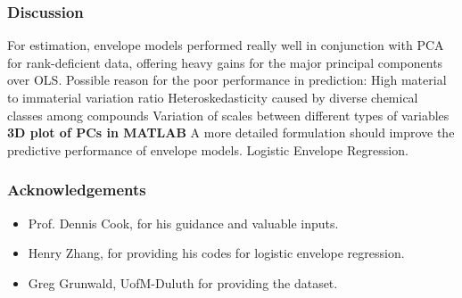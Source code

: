 \documentclass[handout,10pt]{beamer}
\newcommand{\colubf}{\color{UniBlue} \bf}
\begin{document}
\begin{frame}
\frametitle{Discussion}
\begin{outline}
\1 For estimation, envelope models performed really well in conjunction with PCA for rank-deficient data, offering heavy gains for the major principal components over OLS.
\vspace{.2cm}
\1 Possible reason for the poor performance in prediction:
\2 High material to immaterial variation ratio
\2 Heteroskedasticity caused by diverse chemical classes among compounds
\2 Variation of scales between different types of variables
\vspace{.2cm}
\1 {\colubf 3D plot of PCs in MATLAB}
\vspace{.2cm}
\1 A more detailed formulation should improve the predictive performance of envelope models.
\vspace{.2cm}
\1 Logistic Envelope Regression.
\end{outline}
\end{frame}

\begin{frame}
\frametitle{Acknowledgements}
\begin{itemize}
\item Prof. Dennis Cook, for his guidance and valuable inputs.
\vspace{.2cm}
\item Henry Zhang, for providing his codes for logistic envelope regression.
\vspace{.2cm}
\item Greg Grunwald, UofM-Duluth for providing the dataset.
\end{itemize}
\end{frame}
\end{document}
